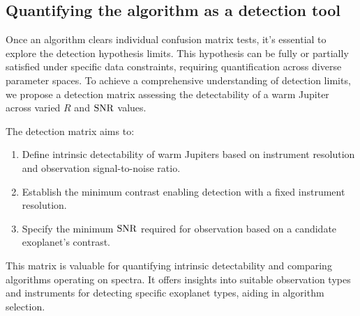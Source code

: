 \subsection{Quantifying the algorithm as a detection tool}

Once an algorithm clears individual confusion matrix tests, it's essential to explore the detection hypothesis limits. 
This hypothesis can be fully or partially satisfied under specific data constraints, requiring quantification across diverse parameter spaces. 
To achieve a comprehensive understanding of detection limits, we propose a detection matrix assessing the detectability of a warm Jupiter across varied $R$ and $\rm{SNR}$ values.

The detection matrix aims to:
\begin{enumerate}
    \item Define intrinsic detectability of warm Jupiters based on instrument resolution and observation signal-to-noise ratio.
    \item Establish the minimum contrast enabling detection with a fixed instrument resolution.
\item Specify the minimum $\rm{SNR}$ required for observation based on a candidate exoplanet's contrast.
\end{enumerate}

This matrix is valuable for quantifying intrinsic detectability and comparing algorithms operating on spectra. It offers insights into suitable observation types and instruments for detecting specific exoplanet types, aiding in algorithm selection.

